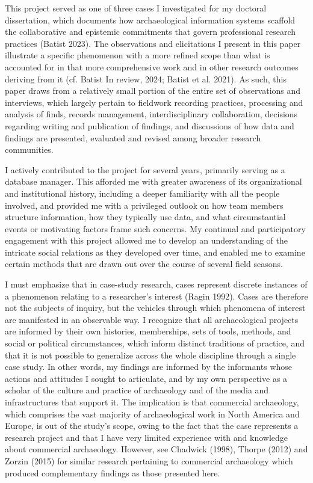 \documentclass[
]{article}
\begin{document}
This project served as one of three cases I investigated for my doctoral
dissertation, which documents how archaeological information systems
scaffold the collaborative and epistemic commitments that govern
professional research practices (Batist 2023). The observations and
elicitations I present in this paper illustrate a specific phenomenon
with a more refined scope than what is accounted for in that more
comprehensive work and in other research outcomes deriving from it (cf.
Batist In review, 2024; Batist et al. 2021). As such, this paper draws
from a relatively small portion of the entire set of observations and
interviews, which largely pertain to fieldwork recording practices,
processing and analysis of finds, records management, interdisciplinary
collaboration, decisions regarding writing and publication of findings,
and discussions of how data and findings are presented, evaluated and
revised among broader research communities.

I actively contributed to the project for several years, primarily
serving as a database manager. This afforded me with greater awareness
of its organizational and institutional history, including a deeper
familiarity with all the people involved, and provided me with a
privileged outlook on how team members structure information, how they
typically use data, and what circumstantial events or motivating factors
frame such concerns. My continual and participatory engagement with this
project allowed me to develop an understanding of the intricate social
relations as they developed over time, and enabled me to examine certain
methods that are drawn out over the course of several field seasons.

I must emphasize that in case-study research, cases represent discrete
instances of a phenomenon relating to a researcher's interest (Ragin
1992). Cases are therefore not the subjects of inquiry, but the vehicles
through which phenomena of interest are manifested in an observable way.
I recognize that all archaeological projects are informed by their own
histories, memberships, sets of tools, methods, and social or political
circumstances, which inform distinct traditions of practice, and that it
is not possible to generalize across the whole discipline through a
single case study. In other words, my findings are informed by the
informants whose actions and attitudes I sought to articulate, and by my
own perspective as a scholar of the culture and practice of archaeology
and of the media and infrastructures that support it. The implication is
that commercial archaeology, which comprises the vast majority of
archaeological work in North America and Europe, is out of the study's
scope, owing to the fact that the case represents a research project and
that I have very limited experience with and knowledge about commercial
archaeology. However, see Chadwick (1998), Thorpe (2012) and Zorzin
(2015) for similar research pertaining to commercial archaeology which
produced complementary findings as those presented here.
\end{document}
